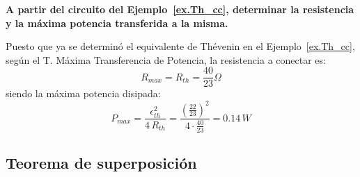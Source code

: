 
\begin{example}\label{ex.tmp_cc}
    \textbf{A partir del circuito del Ejemplo~\ref{ex.Th_cc}, determinar la resistencia y la máxima potencia transferida a la misma.}
    
    Puesto que ya se determinó el equivalente de Thévenin en el Ejemplo~\ref{ex.Th_cc}, según el T. Máxima Transferencia de Potencia, la resistencia a conectar es:
    \begin{equation*}
        R_{max}=R_{th}=\dfrac{40}{23}\Omega
    \end{equation*}
    siendo la máxima potencia disipada:
    \begin{equation*}
        P_{max}=\dfrac{\epsilon_{th}^2}{4\,R_{th}}=\dfrac{(\frac{22}{23})^2}{4\cdot \frac{40}{23}}=0.14\,W
    \end{equation*}
    
\end{example}
	
	\subsection{Teorema de superposición}\label{sec.superposicion_CC}
	
